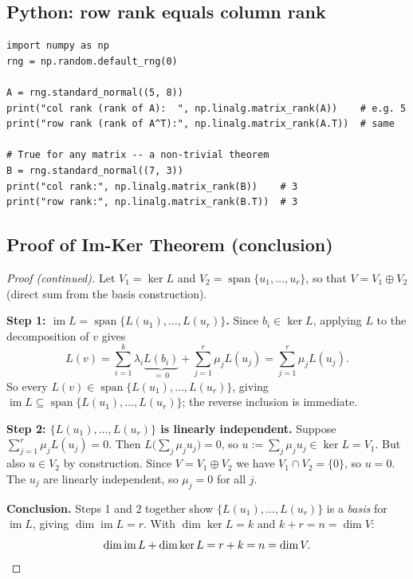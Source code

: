 \documentclass[11pt]{article}
\theoremstyle{definition}
\theoremstyle{plain}
\begin{document}
\subsection{Python: row rank equals column rank}
\begin{lstlisting}
import numpy as np
rng = np.random.default_rng(0)

A = rng.standard_normal((5, 8))
print("col rank (rank of A):  ", np.linalg.matrix_rank(A))    # e.g. 5
print("row rank (rank of A^T):", np.linalg.matrix_rank(A.T))  # same

# True for any matrix -- a non-trivial theorem
B = rng.standard_normal((7, 3))
print("col rank:", np.linalg.matrix_rank(B))    # 3
print("row rank:", np.linalg.matrix_rank(B.T))  # 3
\end{lstlisting}

\subsection{Proof of Im-Ker Theorem (conclusion)}

\begin{proof}[Proof (continued)]
  Let $V_1 = \ker L$ and $V_2 = \operatorname{span}\{u_1,\ldots,u_r\}$,
  so that $V = V_1 \oplus V_2$ (direct sum from the basis construction).

  \textbf{Step 1: $\operatorname{im}L = \operatorname{span}\{L(u_1),\ldots,L(u_r)\}$.}
  Since $b_i \in \ker L$, applying $L$ to the decomposition of $v$ gives
  \[
    L(v) = \sum_{i=1}^k \lambda_i \underbrace{L(b_i)}_{=\,0}
           + \sum_{j=1}^r \mu_j L(u_j)
         = \sum_{j=1}^r \mu_j L(u_j).
  \]
  So every $L(v) \in \operatorname{span}\{L(u_1),\ldots,L(u_r)\}$, giving
  $\operatorname{im}L \subseteq \operatorname{span}\{L(u_1),\ldots,L(u_r)\}$;
  the reverse inclusion is immediate.

  \textbf{Step 2: $\{L(u_1),\ldots,L(u_r)\}$ is linearly independent.}
  Suppose $\sum_{j=1}^r \mu_j L(u_j) = 0$.  Then
  $L\!\bigl(\sum_j \mu_j u_j\bigr) = 0$, so
  $u := \sum_j \mu_j u_j \in \ker L = V_1$.
  But also $u \in V_2$ by construction.
  Since $V = V_1 \oplus V_2$ we have $V_1 \cap V_2 = \{0\}$, so $u = 0$.
  The $u_j$ are linearly independent, so $\mu_j = 0$ for all $j$.

  \textbf{Conclusion.}  Steps 1 and 2 together show
  $\{L(u_1),\ldots,L(u_r)\}$ is a \emph{basis} for $\operatorname{im}L$,
  giving $\dim\operatorname{im}L = r$.
  With $\dim\ker L = k$ and $k + r = n = \dim V$:
  \[
    \dim\operatorname{im}L + \dim\ker L = r + k = n = \dim V. \qedhere
  \]
\end{proof}
\end{document}
